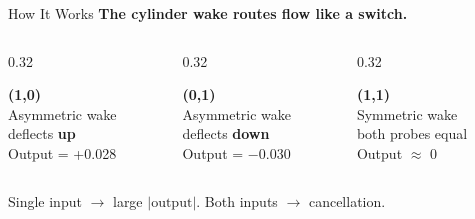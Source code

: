 \documentclass[aspectratio=169,11pt]{beamer}
\begin{document}
\begin{frame}{How It Works}
  \textbf{The cylinder wake routes flow like a switch.}

  \vspace{0.3cm}
  \begin{columns}[T]
    \begin{column}{0.32\textwidth}
      \begin{center}
        \textbf{(1,0)}\\
        \footnotesize
        Asymmetric wake\\
        deflects \textbf{up}\\
        \vspace{0.2cm}
        Output = +0.028
      \end{center}
    \end{column}
    \begin{column}{0.32\textwidth}
      \begin{center}
        \textbf{(0,1)}\\
        \footnotesize
        Asymmetric wake\\
        deflects \textbf{down}\\
        \vspace{0.2cm}
        Output = $-$0.030
      \end{center}
    \end{column}
    \begin{column}{0.32\textwidth}
      \begin{center}
        \textbf{(1,1)}\\
        \footnotesize
        Symmetric wake\\
        both probes equal\\
        \vspace{0.2cm}
        Output $\approx$ 0
      \end{center}
    \end{column}
  \end{columns}

  \vspace{0.5cm}
  \begin{center}
    \textcolor{gdpDarkBlue}{\large Single input $\rightarrow$ large $|\text{output}|$. Both inputs $\rightarrow$ cancellation.}
  \end{center}
\end{frame}
\end{document}
